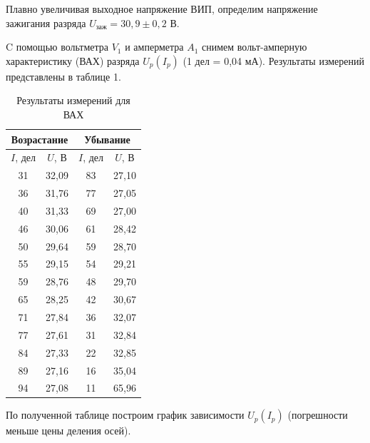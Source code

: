 \documentclass[a4paper]{article}
\theoremstyle{definition}
\theoremstyle{remark}
\begin{document}
Плавно увеличивая выходное напряжение ВИП, определим напряжение зажигания разряда $U_{\text{заж}} = 30,9 \pm 0,2$ В. \medskip

C помощью вольтметра $V_1$ и амперметра $A_1$ снимем вольт-амперную характеристику (ВАХ) разряда $U_p(I_p)$ (1 дел = 0,04 мА). Результаты измерений представлены в таблице 1.

\begin{table}[h!]
    \centering
    \caption{Результаты измерений для ВАХ}
    \begin{tabular}{|c|c|c|c|}
    \hline
    \multicolumn{2}{|c|}{Возрастание} & \multicolumn{2}{c|}{Убывание} \\ \hline
    $I$, дел         & $U$, В         & $I$, дел       & $U$, В       \\ \hline
    31               & 32,09          & 83             & 27,10        \\ \hline
    36               & 31,76          & 77             & 27,05        \\ \hline
    40               & 31,33          & 69             & 27,00        \\ \hline
    46               & 30,06          & 61             & 28,42        \\ \hline
    50               & 29,64          & 59             & 28,70        \\ \hline
    55               & 29,15          & 54             & 29,21        \\ \hline
    59               & 28,76          & 48             & 29,70        \\ \hline
    65               & 28,25          & 42             & 30,67        \\ \hline
    71               & 27,84          & 36             & 32,07        \\ \hline
    77               & 27,61          & 31             & 32,84        \\ \hline
    84               & 27,33          & 22             & 32,85        \\ \hline
    89               & 27,16          & 16             & 35,04        \\ \hline
    94               & 27,08          & 11             & 65,96        \\ \hline
    \end{tabular}
    \end{table}

    По полученной таблице построим график зависимости $U_p(I_p)$ (погрешности меньше цены деления осей).
\end{document}
